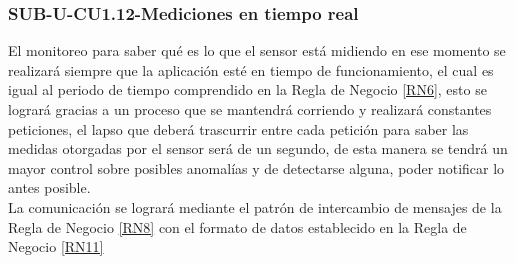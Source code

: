 \subsubsection{SUB-U-CU1.12-Mediciones en tiempo real}\label{SUB-U-CU1.12}
El monitoreo para saber qué es lo que el sensor está midiendo en ese momento se realizará siempre que la aplicación esté en tiempo de funcionamiento, el cual es igual al periodo de tiempo comprendido en la Regla de Negocio \ref{RN6}, esto se logrará gracias a un proceso que se mantendrá corriendo y realizará constantes peticiones, el lapso que deberá trascurrir entre cada petición para saber las medidas otorgadas por el sensor será de un segundo, de esta manera se tendrá un mayor control sobre posibles anomalías y de detectarse alguna, poder notificar lo antes posible.
\\ La comunicación se logrará mediante el patrón de intercambio de mensajes de la Regla de Negocio \ref{RN8} con el formato de datos establecido en la Regla de Negocio \ref{RN11}  

